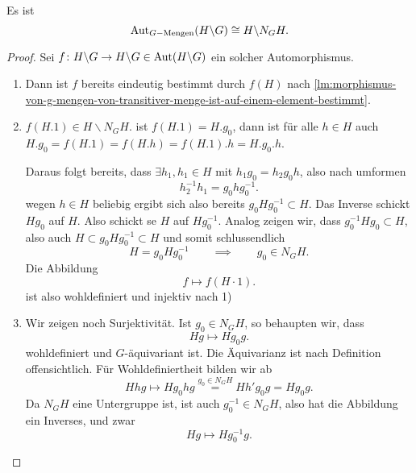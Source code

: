 \begin{proposition}
    Es ist
    \[
        \operatorname{Aut}_{G-\text{Mengen}}(H \backslash G) \cong H \backslash N_GH
    .\] 
\end{proposition}
\begin{proof}
    Sei $f\colon  H \backslash G \to  H \backslash G\in \operatorname{Aut} (H \backslash G)$ ein solcher Automorphismus.
    \begin{enumerate}[1)]
    \item Dann ist $f$ bereits eindeutig bestimmt durch  $f(H)$ nach \autoref{lm:morphismus-von-g-mengen-von-transitiver-menge-ist-auf-einem-element-bestimmt}.
    \item $f(H.1) \in H \backslash N_GH$. ist $f(H.1) = H.g_0$, dann ist für alle $h\in H$ auch $H.g_0 = f(H.1) = f(H.h) = f(H.1).h = H.g_0.h$.

        Daraus folgt bereits, dass $\exists h_1,h_1 \in H$ mit $h_1g_0 = h_2g_0h$, also nach umformen
        \[
       h_2^{-1}h_1 = g_0hg_0^{-1}
        .\] 
        wegen $h\in H$ beliebig ergibt sich also bereits $g_0Hg_0^{-1}\subset H$. Das Inverse schickt $Hg_0$ auf $H$. Also schickt se  $H$ auf  $Hg_0^{-1}$. Analog zeigen wir, dass $g_0^{-1}Hg_0 \subset H$, also auch $H\subset g_0Hg_0^{-1}\subset H$ und somit schlussendlich
        \[
        H = g_0Hg_0^{-1} \qquad \implies \qquad g_0\in N_GH
        .\] 
        Die Abbildung
        \[
            f \mapsto f(H\cdot 1)
        .\] 
        ist also wohldefiniert und injektiv nach 1)

    \item Wir zeigen noch Surjektivität. Ist $g_0\in N_GH$, so behaupten wir, dass
        \[
        Hg \mapsto Hg_0g
        .\] 
        wohldefiniert und $G$-äquivariant ist. Die Äquivarianz ist nach Definition offensichtlich. Für Wohldefiniertheit bilden wir ab
         \[
             Hhg \mapsto H g_0hg \stackrel{g_0\in N_GH}{=} H h'g_0g = Hg_0g
        .\] 
        Da $N_GH$ eine Untergruppe ist, ist auch  $g_0^{-1}\in N_GH$, also hat die Abbildung ein Inverses, und zwar
        \[
        Hg \mapsto Hg_0^{-1}g
        .\] 
\end{enumerate}
\end{proof}
